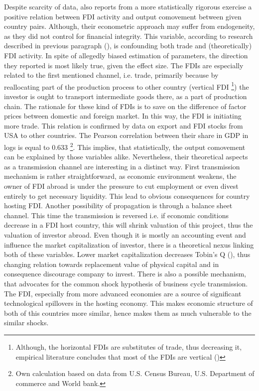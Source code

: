 \documentclass{article}
\begin{document}
Despite scarcity of data, \cite{jasnen_stokman} also reports from a more statistically rigorous exercise a positive relation between FDI activity and output comovement between given country pairs. Although, their econometric approach may suffer from endogeneity, as they did not control for financial integrity. This variable, according to research described in previous paragraph (\cite{imbs}), is confounding both trade and (theoretically) FDI activity. In spite of allegedly biased estimation of parameters, the direction they reported is most likely true, given the effect size. The FDIs are especially related to the first mentioned channel, i.e. trade, primarily because by reallocating part of the production process to other country (vertical FDI \footnote[5]{Although, the horizontal FDIs are substitutes of trade, thus decreasing it, empirical literature concludes that most of the FDIs are vertical (\cite{carr})}) the investor is ought to transport intermediate goods there, as a part of production chain. The rationale for these kind of FDIs is to save on the difference of factor prices between domestic and foreign market. In this way, the FDI is initiating more trade. This relation is confirmed by data on export and FDI stocks from USA to other countries. The Pearson correlation between their share in GDP in logs is equal to 0.633 \footnote[6]{Own calculation based on data from U.S. Census Bureau, U.S. Department of commerce and World bank.}. This implies, that statistically, the output comovement can be explained by those variables alike. Nevertheless, their theoretical aspects as a transmission channel are interesting in a distinct way. First transmission mechanism is rather straightforward, as economic environment weakens, the owner of FDI abroad is under the pressure to cut employment or even divest entirely to get necessary liquidity. This lead to obvious consequences for country hosting FDI. Another possibility of propagation is through a balance sheet channel. This time the transmission is reversed i.e. if economic conditions decrease in a FDI host country, this will shrink valuation of this project, thus the valuation of investor abroad. Even though it is mostly an accounting event and influence the market capitalization of investor, there is a theoretical nexus linking both of these variables. Lower market capitalization decreases Tobin's Q (\cite{kaldor}), thus changing relation towards replacement value of physical capital and in consequence discourage company to invest. There is also a possible mechanism, that advocates for the common shock hypothesis of business cycle transmission. The FDI, especially from more advanced economies are a source of significant technological spillovers in the hosting economy. This makes economic structure of both of this countries more similar, hence makes them as much vulnerable to the similar shocks. 
\end{document}
